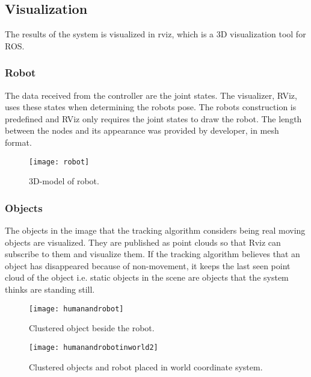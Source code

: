 \subsection{Visualization}

The results of the system is visualized in rviz, which is a 3D visualization tool for ROS. 

\subsubsection{Robot}
The data received from the controller are the joint states.
The visualizer, RViz, uses these states when determining the robots pose.
The robots construction is predefined and RViz only requires the joint states to draw the robot.
The length between the nodes and its appearance was provided by developer, in mesh format.

\begin{figure}[H]
\begin{center}
\texttt{[image: robot]}
\caption{3D-model of robot.}

\end{center}
\end{figure}

\subsubsection{Objects}
The objects in the image that the tracking algorithm considers being real moving objects are visualized. They are published as point clouds so that Rviz can subscribe to them and visualize them. If the tracking algorithm believes that an object has disappeared because of non-movement, it keeps the last seen point cloud of the object i.e. static objects in the scene are objects that the system thinks are standing still. 

\begin{figure}[H]
\begin{center}
\texttt{[image: humanandrobot]}
\caption{Clustered object beside the robot.}

\end{center}
\end{figure}

\begin{figure}[H]
\begin{center}
\texttt{[image: humanandrobotinworld2]}
\caption{Clustered objects and robot placed in world coordinate system.}

\end{center}
\end{figure}  

